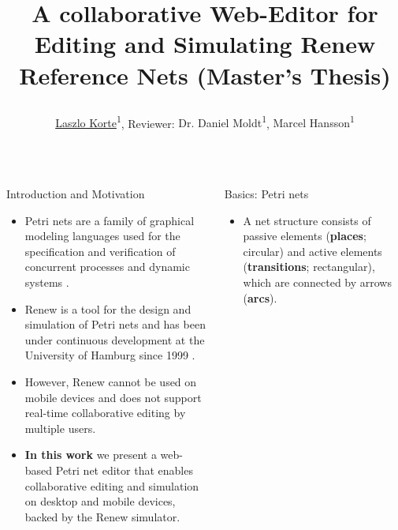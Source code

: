 \documentclass[25pt, a0paper, portrait, margin=0mm, innermargin=15mm,blockverticalspace=2mm, colspace=5mm, subcolspace=4mm]{tikzposter}
\title{\parbox{1800pt}{A collaborative Web-Editor for Editing and Simulating Renew Reference Nets (Master's Thesis)}}
\author{{\underline{Laszlo Korte}\textsuperscript{1}}, Reviewer: {Dr. Daniel Moldt\textsuperscript{1}}, {Marcel Hansson\textsuperscript{1}}}
\institute{\textsuperscript{1}University of Hamburg, MIN-Fakultät, Fachbereich Informatik}
\begin{document}
\maketitle


%
\block{}{
}
\begin{columns}

\vspace{-1cm} %

\begin{posterbox}{Introduction and Motivation}

 \LARGE
 \begin{itemize}

 \item Petri nets are a family of graphical modeling languages used for the specification and verification of concurrent processes and dynamic systems \cite{Petri77}.

 \item {\sc Renew} is a tool for the design and simulation of Petri nets and has been under continuous development at the University of Hamburg since 1999 \cite{Kummer+99}.

 \item However, {\sc Renew} cannot be used on mobile devices and does not support real-time collaborative editing by multiple users.

 \item \textbf{In this work} we present a web-based Petri net editor that enables collaborative editing and simulation on desktop and mobile devices, backed by the {\sc Renew} simulator.
 \end{itemize}


\end{posterbox}



\begin{posterbox}{Basics: Petri nets}

 \LARGE

 \begin{itemize}

 \item A net structure consists of passive elements (\textbf{places}; circular) and active elements (\textbf{transitions}; rectangular), which are connected by arrows (\textbf{arcs}).


\end{itemize}
\end{posterbox}
\end{columns}
\end{document}
